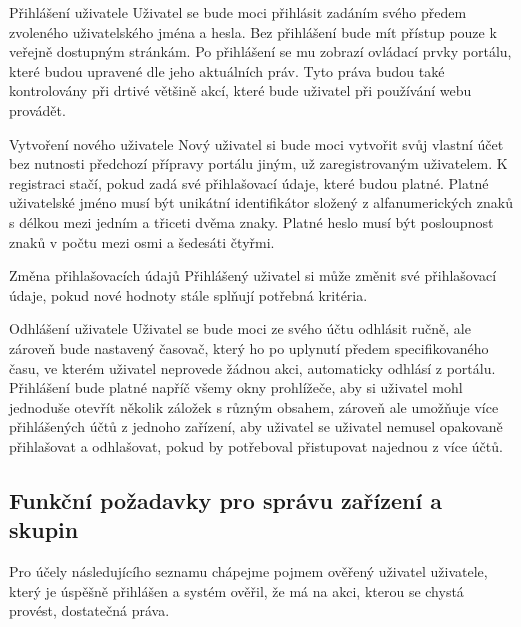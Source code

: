 \def\myprefix{F}
\begin{enumfunctional}[style=nextline]
\item[Přihlášení uživatele]
Uživatel se bude moci přihlásit zadáním svého předem zvoleného uživatelského jména a hesla. Bez přihlášení bude mít přístup pouze k veřejně dostupným stránkám. Po přihlášení se mu zobrazí ovládací prvky portálu, které budou upravené dle jeho aktuálních práv. Tyto práva budou také kontrolovány při drtivé většině akcí, které bude uživatel při používání webu provádět. 
\item[Vytvoření nového uživatele]
Nový uživatel si bude moci vytvořit svůj vlastní účet bez nutnosti předchozí přípravy portálu jiným, už zaregistrovaným uživatelem. K registraci stačí, pokud zadá své přihlašovací údaje, které budou platné. Platné uživatelské jméno musí být unikátní identifikátor složený z alfanumerických znaků s délkou mezi jedním a třiceti dvěma znaky. Platné heslo musí být posloupnost znaků v počtu mezi osmi a šedesáti čtyřmi.
\item[Změna přihlašovacích údajů]
Přihlášený uživatel si může změnit své přihlašovací údaje, pokud nové hodnoty stále splňují potřebná kritéria.
\item[Odhlášení uživatele]
Uživatel se bude moci ze svého účtu odhlásit ručně, ale zároveň bude nastavený časovač, který ho po uplynutí předem specifikovaného času, ve kterém uživatel neprovede žádnou akci, automaticky odhlásí z portálu. Přihlášení bude platné napříč všemy okny prohlížeče, aby si uživatel mohl jednoduše otevřít několik záložek s různým obsahem, zároveň ale umožňuje více přihlášených účtů z jednoho zařízení, aby uživatel se uživatel nemusel opakovaně přihlašovat a odhlašovat, pokud by potřeboval přistupovat najednou z více účtů.

\subsection{Funkční požadavky pro správu zařízení a skupin}
Pro účely následujícího seznamu chápejme pojmem ověřený uživatel uživatele, který je úspěšně přihlášen a systém ověřil, že má na akci, kterou se chystá provést, dostatečná práva.


\end{enumfunctional}
